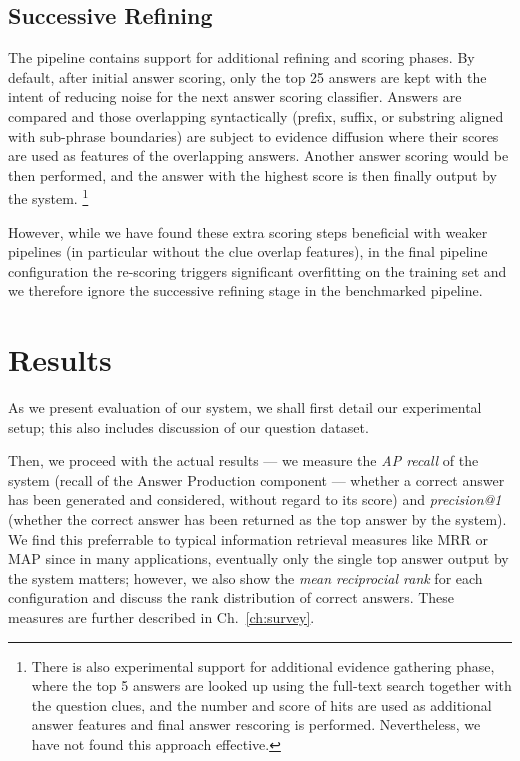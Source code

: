\subsection{Successive Refining}

The pipeline contains support for additional refining and scoring phases.
By default, after initial answer scoring,
only the top 25 answers are kept with the intent of reducing noise for the next answer scoring classifier.
Answers are compared and those overlapping syntactically (prefix, suffix, or substring aligned with sub-phrase boundaries)
are subject to evidence diffusion where their scores are used as features of the overlapping answers.
Another answer scoring would be then performed, and the answer with the highest score is then finally output by the system.%
\footnote{There is also experimental support for additional evidence gathering phase, where the top 5 answers are looked up using the full-text search together with the question clues, and the number and score of hits are used as additional answer features and final answer rescoring is performed.  Nevertheless, we have not found this approach effective.}

However, while we have found these extra scoring steps beneficial with
weaker pipelines (in particular without the clue overlap features),
in the final pipeline configuration the re-scoring triggers significant
overfitting on the training set and we therefore ignore
the successive refining stage in the benchmarked pipeline.


\section{Results}
\label{sec:results}

As we present evaluation of our system,
we shall first detail our experimental setup;
this also includes discussion of our question dataset.

Then, we proceed with the actual results --- we measure the \textit{AP recall}
of the system (recall of the Answer Production component --- whether a correct answer has been generated and considered,
without regard to its score) and \textit{precision@1} (whether the
correct answer has been returned as the top answer by the system).
We find this preferrable to typical information retrieval measures like MRR or MAP
since in many applications, eventually only the single top answer output by the system
matters; however, we also show the \textit{mean reciprocial rank}
for each configuration and discuss the rank distribution of correct answers.
These measures are further described in Ch.~\ref{ch:survey}.

